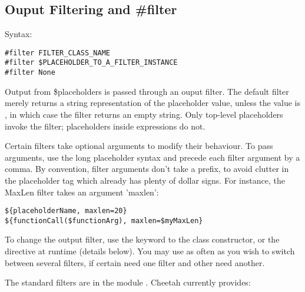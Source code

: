 \subsection{Ouput Filtering and \#filter}
\label{output.filter}

Syntax:
\begin{verbatim}
#filter FILTER_CLASS_NAME
#filter $PLACEHOLDER_TO_A_FILTER_INSTANCE
#filter None
\end{verbatim}


Output from \$placeholders is passed through an ouput filter.  The default
filter merely returns a string representation of the placeholder value,
unless the value is , in which case the filter returns an empty
string.  Only top-level placeholders invoke the filter; placeholders inside
expressions do not.

Certain filters take optional arguments to modify their behaviour.  To pass
arguments, use the long placeholder syntax and precede each filter argument by
a comma.  By convention, filter arguments don't take a \code{\$} prefix, to
avoid clutter in the placeholder tag which already has plenty of dollar signs.
For instance, the MaxLen filter takes an argument 'maxlen':

\begin{verbatim}
${placeholderName, maxlen=20}
${functionCall($functionArg), maxlen=$myMaxLen}
\end{verbatim}

To change the output filter, use the  keyword to the
 class constructor, or the 
directive at runtime (details below).  You may use  as often as
you wish to switch between several filters, if certain 
need one filter and other  need another.

The standard filters are in the module .  Cheetah
currently provides:

